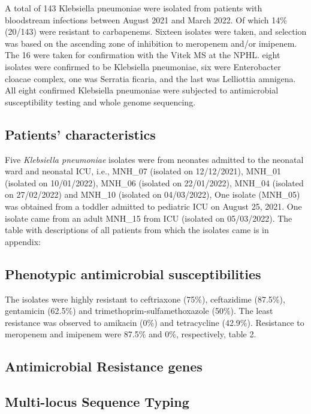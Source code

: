 \documentclass[preprint, 3p,
authoryear]{elsarticle} %
\begin{document}
A total of 143 Klebsiella pneumoniae were isolated from patients with
bloodstream infections between August 2021 and March 2022. Of which 14\%
(20/143) were resistant to carbapenems. Sixteen isolates were taken, and
selection was based on the ascending zone of inhibition to meropenem
and/or imipenem. The 16 were taken for confirmation with the Vitek MS at
the NPHL. eight isolates were confirmed to be Klebsiella pneumoniae, six
were Enterobacter cloacae complex, one was Serratia ficaria, and the
last was Lelliottia amnigena. All eight confirmed Klebsiella pneumoniae
were subjected to antimicrobial susceptibility testing and whole genome
sequencing.

\subsection{Patients' characteristics}\label{patients-characteristics}

Five \emph{Klebsiella pneumoniae} isolates were from neonates admitted
to the neonatal ward and neonatal ICU, i.e., MNH\_07 (isolated on
12/12/2021), MNH\_01 (isolated on 10/01/2022), MNH\_06 (isolated on
22/01/2022), MNH\_04 (isolated on 27/02/2022) and MNH\_10 (isolated on
04/03/2022), One isolate (MNH\_05) was obtained from a toddler admitted
to pediatric ICU on August 25, 2021. One isolate came from an adult
MNH\_15 from ICU (isolated on 05/03/2022). The table with descriptions
of all patients from which the isolates came is in appendix:

\subsection{Phenotypic antimicrobial
susceptibilities}\label{phenotypic-antimicrobial-susceptibilities}

The isolates were highly resistant to ceftriaxone (75\%), ceftazidime
(87.5\%), gentamicin (62.5\%) and trimethoprim-sulfamethoxazole (50\%).
The least resistance was observed to amikacin (0\%) and tetracycline
(42.9\%). Resistance to meropenem and imipenem were 87.5\% and 0\%,
respectively, table 2.

\subsection{Antimicrobial Resistance
genes}\label{antimicrobial-resistance-genes}

\subsection{Multi-locus Sequence
Typing}\label{multi-locus-sequence-typing}
\end{document}
